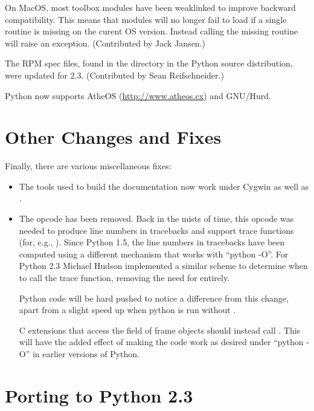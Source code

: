 \documentclass{howto}
\begin{document}
On MacOS, most toolbox modules have been weaklinked to improve
backward compatibility.  This means that modules will no longer fail
to load if a single routine is missing on the curent OS version.
Instead calling the missing routine will raise an exception.
(Contributed by Jack Jansen.)

The RPM spec files, found in the  directory in the
Python source distribution, were updated for 2.3.  (Contributed by
Sean Reifschneider.)

Python now supports AtheOS (\url{http://www.atheos.cx}) and GNU/Hurd.


\section{Other Changes and Fixes}

Finally, there are various miscellaneous fixes:

\begin{itemize}

\item The tools used to build the documentation now work under Cygwin
as well as \UNIX.

\item The  opcode has been removed.  Back in the
mists of time, this opcode was needed to produce line numbers in
tracebacks and support trace functions (for, e.g., ).
Since Python 1.5, the line numbers in tracebacks have been computed
using a different mechanism that works with ``python -O''.  For Python
2.3 Michael Hudson implemented a similar scheme to determine when to
call the trace function, removing the need for 
entirely.

Python code will be hard pushed to notice a difference from this
change, apart from a slight speed up when python is run without
.

C extensions that access the  field of frame objects
should instead call .
This will have the added effect of making the code work as desired
under ``python -O'' in earlier versions of Python.

\end{itemize}


\section{Porting to Python 2.3}
\end{document}
